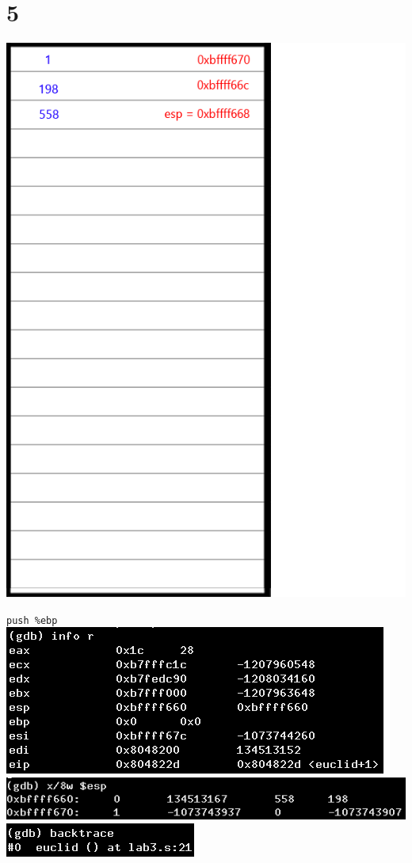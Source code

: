 \documentclass{article}
\begin{document}
\section*{5}
\begin{minipage}{5cm}
\includegraphics[scale=0.3]{s3.png}
\end{minipage}
\begin{minipage}{8cm}
\verb|push %ebp|\\
\includegraphics[scale=0.4]{info5.png} \\
\includegraphics[scale=0.3]{x5.png} \\
\includegraphics[scale=0.5]{bt5.png} \\
\end{minipage}
\clearpage
\end{document}
